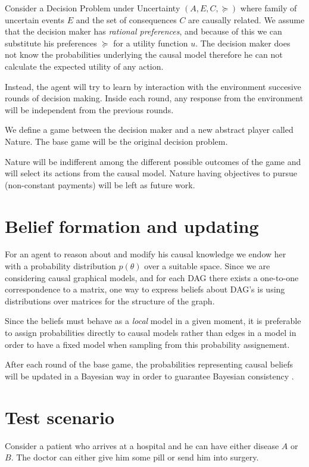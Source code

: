 \documentclass{article}
\begin{document}
Consider a Decision Problem under Uncertainty $(A,E,C,\succeq)$ where family of uncertain events $E$ and the set of consequences $C$ are causally related. We assume that the decision maker has \textit{rational preferences}, and because of this we can substitute his preferences $\succeq$ for a utility function $u$. The decision maker does not know the probabilities underlying the causal model therefore he can not calculate the expected utility of any action. 

Instead, the agent will try to learn by interaction with the environment succesive rounds of decision making. Inside each round, any response from the environment will be independent from the previous rounds.

We define a game between the decision maker and a new abstract player called Nature. The base game will be the original decision problem.

Nature will be indifferent among the different possible outcomes of the game and will select its actions from the causal model. Nature having objectives to pursue (non-constant payments) will be left as future work.

\section{Belief formation and updating}
For an agent to reason about and modify his causal knowledge we endow her with a probability distribution $p(\theta)$ over a suitable space. Since we are considering causal graphical models, and for each DAG there exists a one-to-one correspondence to a matrix, one way to express beliefs about DAG's is using distributions over matrices for the structure of the graph.

Since the beliefs must behave as a \textit{local} model in a given moment, it is preferable to assign probabilities directly to causal models rather than edges in a model in order to have a fixed model when sampling from this probability assignement.

After each round of the base game, the probabilities representing causal beliefs will be updated in a Bayesian way in order to guarantee Bayesian consistency \cite{shoham2008multiagent}.
\section{Test scenario}
Consider a patient who arrives at a hospital and he can have either disease $A$ or $B$. The doctor can either give him some pill or send him into surgery. 
\end{document}
